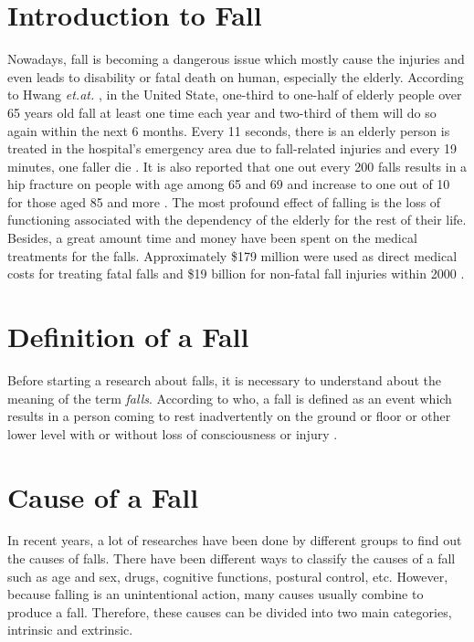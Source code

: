 \documentclass[letterpaper,12pt,titlepage,oneside,final]{book}
\begin{document}
\section{Introduction to Fall}
Nowadays, fall is becoming a dangerous issue which mostly cause the injuries and even leads to disability or fatal death on human, especially the elderly. According to Hwang \textit{et.at.} \cite{static1}, in the United State, one-third to one-half of elderly people over 65 years old fall at least one time each year  and two-third of them will do so again within the next 6 months. Every 11 seconds, there is an elderly person is treated in the hospital's emergency area due to fall-related injuries and every 19 minutes, one faller die \cite{fall_die}. It is also reported that one out every 200 falls results in a hip fracture on people with age among 65 and 69 and increase to one out of 10 for those aged 85 and more \cite{hip_fracture}. The most profound effect of falling is the loss of functioning associated with the dependency of the elderly for the rest of their life. Besides, a great amount time and money have been spent on the medical treatments for the falls. Approximately \$179 million were used as direct medical costs for treating fatal falls and \$19 billion for non-fatal fall injuries within 2000 \cite{cost_fatal}.

\section{Definition of a Fall}
Before starting a research about falls, it is necessary to understand about the meaning of the term \textit{falls}. According to \gls{who}, a fall is defined as an event which results in a person coming to rest inadvertently on the ground or floor or other lower level with or without loss of consciousness or injury \cite{who}. 

\section{Cause of a Fall}
In recent years, a lot of researches have been done by different groups to find out the causes of falls. There have been different ways to classify the causes of a fall such as age and sex, drugs, cognitive functions, postural control, etc. However, because falling is an unintentional action, many causes usually combine to produce a fall. Therefore, these causes can be divided into two main categories, intrinsic and extrinsic.
\end{document}
